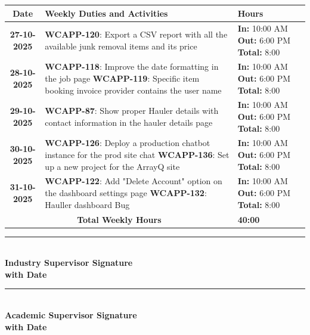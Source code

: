 \documentclass[a4paper,11pt]{article}
\begin{document}
\begin{tabularx}{\textwidth}{|c|>{\raggedright\arraybackslash}X|>{\centering\arraybackslash}m{3.5cm}|}
\hline
\rowcolor{gray!30}
\textbf{Date} & \textbf{Weekly Duties and Activities} & \textbf{Hours} \\
\hline
\textbf{27-10-2025} & \textbf{WCAPP-120}: Export a CSV report with all the available junk removal items and its price & \textbf{In:} 10:00 AM \newline \textbf{Out:} 6:00 PM \newline \textbf{Total:} 8:00 \\
\hline
\textbf{28-10-2025} & \textbf{WCAPP-118}: Improve the date formatting in the job page \newline \textbf{WCAPP-119}: Specific item booking invoice provider contains the user name & \textbf{In:} 10:00 AM \newline \textbf{Out:} 6:00 PM \newline \textbf{Total:} 8:00 \\
\hline
\textbf{29-10-2025} & \textbf{WCAPP-87}: Show proper Hauler details with contact information in the hauler details page & \textbf{In:} 10:00 AM \newline \textbf{Out:} 6:00 PM \newline \textbf{Total:} 8:00 \\
\hline
\textbf{30-10-2025} & \textbf{WCAPP-126}: Deploy a production chatbot instance for the prod site chat \newline \textbf{WCAPP-136}: Set up a new project for the ArrayQ site & \textbf{In:} 10:00 AM \newline \textbf{Out:} 6:00 PM \newline \textbf{Total:} 8:00 \\
\hline
\textbf{31-10-2025} & \textbf{WCAPP-122}: Add "Delete Account" option on the dashboard settings page \newline \textbf{WCAPP-132}: Hauller dashboard Bug & \textbf{In:} 10:00 AM \newline \textbf{Out:} 6:00 PM \newline \textbf{Total:} 8:00 \\
\hline
\multicolumn{2}{|c|}{\textbf{Total Weekly Hours}} & \textbf{40:00} \\
\hline
\end{tabularx}

\vspace{3em}

\noindent
\begin{minipage}[t]{0.45\textwidth}
\rule{0.8\textwidth}{0.4pt} \\
\textbf{Industry Supervisor Signature} \\
\textbf{with Date}
\end{minipage}
\hfill
\begin{minipage}[t]{0.45\textwidth}
\rule{0.8\textwidth}{0.4pt} \\
\textbf{Academic Supervisor Signature} \\
\textbf{with Date}
\end{minipage}
\end{document}
